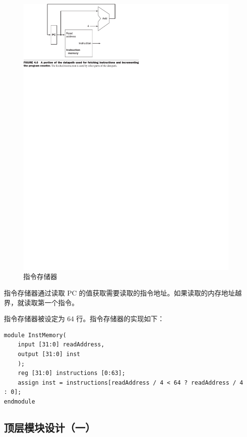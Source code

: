 \documentclass[a4paper,UTF8]{ctexart}
\begin{document}
\begin{figure}[h]
    \centering
    \includegraphics[width=\textwidth]{instruction.pdf}
    \caption{指令存储器}
    \label{fig:instr}
\end{figure}

指令存储器通过读取 PC 的值获取需要读取的指令地址。如果读取的内存地址越界，就读取第一个指令。

指令存储器被设定为 64 行。指令存储器的实现如下：

\begin{lstlisting}[caption=InstMemory.v]
module InstMemory(
    input [31:0] readAddress,
    output [31:0] inst
    );
    reg [31:0] instructions [0:63];
    assign inst = instructions[readAddress / 4 < 64 ? readAddress / 4 : 0];
endmodule
\end{lstlisting}

\subsection{顶层模块设计（一）}
\end{document}

